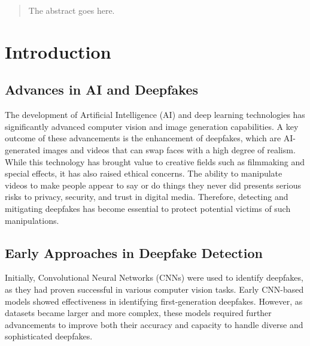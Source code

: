 \documentclass[conference]{IEEEtran}
\begin{document}
		
		
		
		
		
		
		
		\maketitle
		
		\begin{abstract}
			The abstract goes here.
		\end{abstract}
		
		
		
		
		
		\IEEEpeerreviewmaketitle
		
		
		
		\section{Introduction}
		\subsection{Advances in AI and Deepfakes}
		The development of Artificial Intelligence (AI) and deep learning technologies has significantly advanced computer vision and image generation capabilities. A key outcome of these advancements is the enhancement of deepfakes, which are AI-generated images and videos that can swap faces with a high degree of realism. While this technology has brought value to creative fields such as filmmaking and special effects, it has also raised ethical concerns. The ability to manipulate videos to make people appear to say or do things they never did presents serious risks to privacy, security, and trust in digital media. Therefore, detecting and mitigating deepfakes has become essential to protect potential victims of such manipulations.
		
		\subsection{Early Approaches in Deepfake Detection}
		Initially, Convolutional Neural Networks (CNNs) were used to identify deepfakes, as they had proven successful in various computer vision tasks. Early CNN-based models showed effectiveness in identifying first-generation deepfakes. However, as datasets became larger and more complex, these models required further advancements to improve both their accuracy and capacity to handle diverse and sophisticated deepfakes.
		
\end{document}
